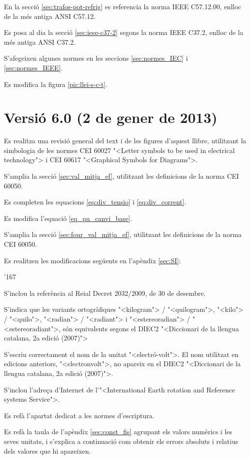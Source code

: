 En la secci\'{o} \ref{sec:trafos-pot-refrig} es referencia la norma  \textsf{IEEE C57.12.00}, enlloc de la m\'{e}s antiga \textsf{ANSI C57.12}.

Es posa al dia la secci\'{o} \ref{sec:ieee-c37-2} segons la norma \textsf{IEEE C37.2}, enlloc de la m\'{e}s antiga \textsf{ANSI C37.2}.

S'afegeixen algunes normes en les seccions \ref{sec:normes_IEC} i \ref{sec:normes_IEEE}.

Es modifica  la figura \ref{pic:llei-s-c-t}.


\section*{Versi\'{o} 6.0 (2 de gener de 2013)}

Es realitza una revisi\'{o} general del text i de les figures d'aquest  llibre, utilitzant la simbologia de les normes \textsf{CEI 60027}  {"<}Letter symbols to be used in electrical technology{">} i  \textsf{CEI 60617}  {"<}Graphical Symbols for Diagrams{">}.

S'amplia la secci\'{o} \ref{sec:val_mitja_ef}, utilitzant les definicions de la norma \textsf{CEI 60050}.

Es completen les equacions \eqref{eq:div_tensio} i \eqref{eq:div_corrent}.

Es modifica l'equaci\'{o} \eqref{eq_pu_canvi_base}.

S'amplia la secci\'{o}  \ref{sec:four_val_mitja_ef}, utilitzant les definicions de la norma \textsf{CEI 60050}.

Es realitzen les modificacions seg\"{u}ents en l'ap\`{e}ndix \ref{sec:SI}:
\begin{dinglist}{'167}
   \item  S'inclou la refer\`{e}ncia al Reial Decret 2032/2009, de 30 de desembre.
   \item S'indica que les variants ortogr\`{a}fiques  {"<}kilogram{">}  / {"<}quilogram{">}, {"<}kilo{">} / {"<}quilo{">}, {"<}radian{">} / {"<}radiant{">} i
   {"<}estereoradian{">} / {"<}estereoradiant{">}, s\'{o}n equivalents segons el DIEC2 {"<}Diccionari de la llengua catalana, 2a edici\'{o} (2007){">}
    \item S'escriu correctament el nom de la unitat {"<}electr\'{o}-volt{">}. El nom  utilitzat en edicions anteriors,   {"<}electronvolt{">}, no apareix en el DIEC2 {"<}Diccionari de la llengua catalana, 2a edici\'{o} (2007){">}.
    \item S'inclou l'adre\c{c}a d'Internet de l'{"<}International Earth rotation and Reference systems Service{">}.
     \item Es ref\`{a} l'apartat dedicat a les normes d'escriptura.
\end{dinglist}

Es ref\`{a} la taula de l'ap\`{e}ndix \ref{sec:const_fis} agrupant els valors num\`{e}rics i les seves unitats, i s'explica a continuaci\'{o} com obtenir els errors absoluts i relatius dels valores que hi apareixen.

